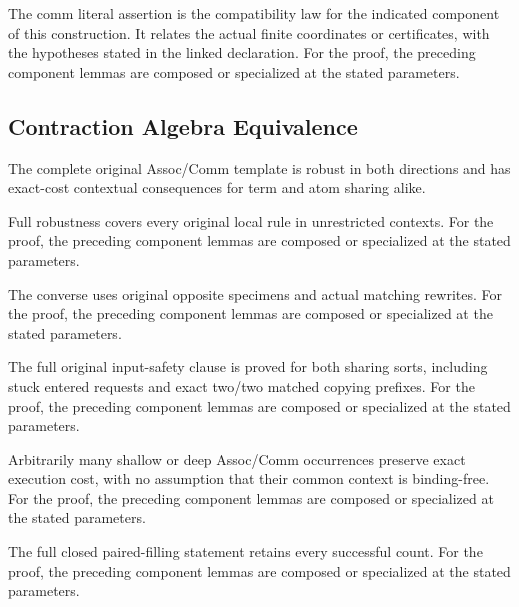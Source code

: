 The comm literal assertion is the compatibility law for the indicated component of this construction. It relates the actual finite coordinates or certificates, with the hypotheses stated in the linked declaration.
For the proof, the preceding component lemmas are composed or specialized at the stated parameters.
\par{}

\subsection{Contraction Algebra Equivalence}
The complete original Assoc/Comm template is robust in both directions and has exact-cost contextual consequences for term and atom sharing alike.

Full robustness covers every original local rule in unrestricted contexts.
For the proof, the preceding component lemmas are composed or specialized at the stated parameters.
\par{}

The converse uses original opposite specimens and actual matching rewrites.
For the proof, the preceding component lemmas are composed or specialized at the stated parameters.
\par{}

The full original input-safety clause is proved for both sharing sorts, including stuck entered requests and exact two/two matched copying prefixes.
For the proof, the preceding component lemmas are composed or specialized at the stated parameters.
\par{}

Arbitrarily many shallow or deep Assoc/Comm occurrences preserve exact execution cost, with no assumption that their common context is binding-free.
For the proof, the preceding component lemmas are composed or specialized at the stated parameters.
\par{}

The full closed paired-filling statement retains every successful count.
For the proof, the preceding component lemmas are composed or specialized at the stated parameters.
\par{}

